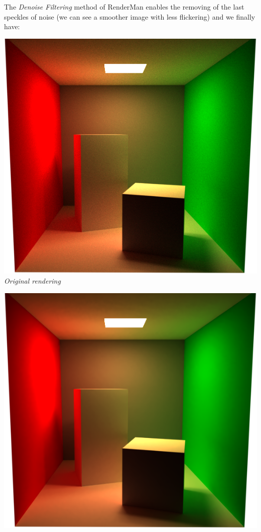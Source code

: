 \documentclass[a4,12pt]{article}
\begin{document}
	The \textit{Denoise Filtering} method of RenderMan enables the removing of the last speckles of noise (we can see a smoother image with less flickering) and we finally have:
	\begin{center}
		\begin{minipage}[b]{0.4\linewidth}
			\begin{center}
				\includegraphics[width = \textwidth]{./Worksheet9/beforeDenoising.png}\\
				\textit{Original rendering}\\
			\end{center}
		\end{minipage}
		\hspace{0.05\linewidth}
		\begin{minipage}[b]{0.4\linewidth}
			\begin{center}
				\includegraphics[width = \textwidth]{./Worksheet9/afterDenoising.png}\\

\end{center}
\end{minipage}
\end{center}
\end{document}
